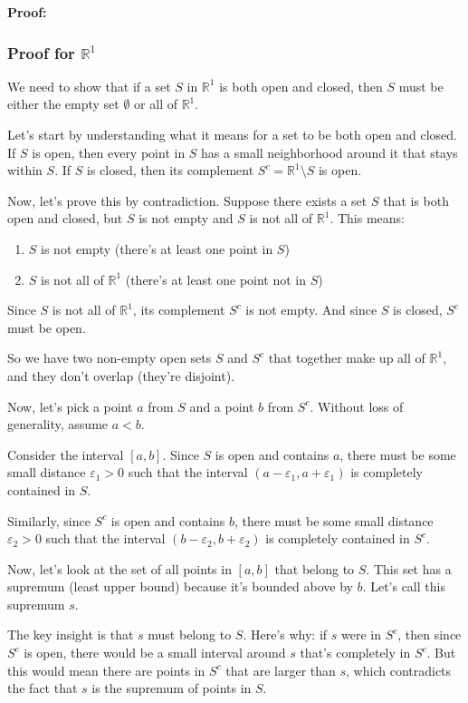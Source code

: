 \textbf{Proof:}

\subsubsection*{Proof for $\mathbb{R}^1$}

We need to show that if a set $S$ in $\mathbb{R}^1$ is both open and closed, then $S$ must be either the empty set $\emptyset$ or all of $\mathbb{R}^1$.

Let's start by understanding what it means for a set to be both open and closed. If $S$ is open, then every point in $S$ has a small neighborhood around it that stays within $S$. If $S$ is closed, then its complement $S^c = \mathbb{R}^1 \setminus S$ is open.

Now, let's prove this by contradiction. Suppose there exists a set $S$ that is both open and closed, but $S$ is not empty and $S$ is not all of $\mathbb{R}^1$. This means:
\begin{enumerate}
\item $S$ is not empty (there's at least one point in $S$)
\item $S$ is not all of $\mathbb{R}^1$ (there's at least one point not in $S$)
\end{enumerate}

Since $S$ is not all of $\mathbb{R}^1$, its complement $S^c$ is not empty. And since $S$ is closed, $S^c$ must be open.

So we have two non-empty open sets $S$ and $S^c$ that together make up all of $\mathbb{R}^1$, and they don't overlap (they're disjoint).

Now, let's pick a point $a$ from $S$ and a point $b$ from $S^c$. Without loss of generality, assume $a < b$.

Consider the interval $[a, b]$. Since $S$ is open and contains $a$, there must be some small distance $\varepsilon_1 > 0$ such that the interval $(a - \varepsilon_1, a + \varepsilon_1)$ is completely contained in $S$.

Similarly, since $S^c$ is open and contains $b$, there must be some small distance $\varepsilon_2 > 0$ such that the interval $(b - \varepsilon_2, b + \varepsilon_2)$ is completely contained in $S^c$.

Now, let's look at the set of all points in $[a, b]$ that belong to $S$. This set has a supremum (least upper bound) because it's bounded above by $b$. Let's call this supremum $s$.

The key insight is that $s$ must belong to $S$. Here's why: if $s$ were in $S^c$, then since $S^c$ is open, there would be a small interval around $s$ that's completely in $S^c$. But this would mean there are points in $S^c$ that are larger than $s$, which contradicts the fact that $s$ is the supremum of points in $S$.

